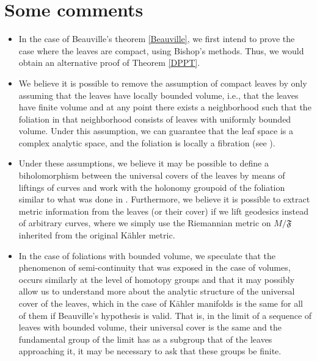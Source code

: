 \documentclass[12pt,twoside,a4paper]{report}
\begin{document}
\section{Some comments}
\begin{itemize}
        \item In the case of Beauville's theorem \ref{Beauville}, we first intend to prove the case where
        the leaves are compact, using Bishop's methods. Thus, we would obtain an alternative proof of
        Theorem \ref{DPPT}.

        \item We believe it is possible to remove the assumption of compact leaves by only assuming that the
        leaves have locally bounded volume, i.e., that the leaves have finite volume and at any point there exists
        a neighborhood such that the foliation in that neighborhood consists of leaves with uniformly bounded volume. Under this
        assumption, we can guarantee that the leaf space is a complex analytic space, and the foliation is
        locally a fibration (see \cite{A-V}).

        \item Under these assumptions, we believe it may be possible to define a biholomorphism between the universal covers
        of the leaves by means of liftings of curves and work with the holonomy groupoid of the foliation
        similar to what was done in \cite{DPPT}. Furthermore, we believe it is possible to extract metric information from the
        leaves (or their cover) if we lift geodesics instead of arbitrary curves, where we simply use the
        Riemannian metric on $M/\mathfrak{F}$ inherited from the original Kähler metric.

        \item In the case of foliations with bounded volume, we speculate that the phenomenon of semi-continuity that was exposed in the case
        of volumes, occurs similarly at the level of homotopy groups and that it may possibly allow us to understand more about the
        analytic structure of the universal cover of the leaves, which in the case of Kähler manifolds is the same for all of them
        if Beauville's hypothesis is valid. That is, in the limit of a sequence of leaves with bounded volume, their universal
        cover is the same and the fundamental group of the limit has as a subgroup that of the leaves approaching it,
        it may be necessary to ask that these groups be finite.


\end{itemize}
\end{document}
